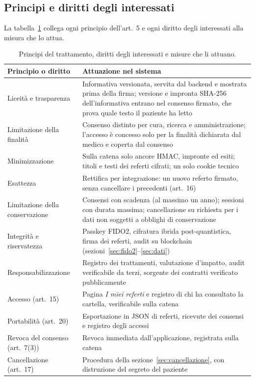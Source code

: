 \subsection{Principi e diritti degli interessati}
La tabella~\ref{tab:principi} collega ogni principio dell'art.~5 e ogni diritto degli interessati alla misura che lo attua.

\begin{table}[H]
\centering\footnotesize
\renewcommand{\arraystretch}{1.2}
\begin{tabular}{@{}p{} p{}@{}}
\toprule
Principio o diritto & Attuazione nel sistema\\
\midrule
Liceità e trasparenza & Informativa versionata, servita dal backend e mostrata prima della firma; versione e impronta SHA-256 dell'informativa entrano nel consenso firmato, che prova quale testo il paziente ha letto\\
Limitazione della finalità & Consenso distinto per cura, ricerca e amministrazione; l'accesso è concesso solo per la finalità dichiarata dal medico e coperta dal consenso\\
Minimizzazione & Sulla catena solo ancore HMAC, impronte ed esiti; titoli e testi dei referti cifrati; un solo cookie tecnico\\
Esattezza & Rettifica per integrazione: un nuovo referto firmato, senza cancellare i precedenti (art.~16)\\
Limitazione della conservazione & Consensi con scadenza (al massimo un anno); sessioni con durata massima; cancellazione su richiesta per i dati non soggetti a obblighi di conservazione\\
Integrità e riservatezza & Passkey FIDO2, cifratura ibrida post-quantistica, firma dei referti, audit su blockchain (sezioni~\ref{sec:fido2}--\ref{sec:dati})\\
Responsabilizzazione & Registro dei trattamenti, valutazione d'impatto, audit verificabile da terzi, sorgente dei contratti verificato pubblicamente\\
\midrule
Accesso (art.~15) & Pagina \emph{I miei referti} e registro di chi ha consultato la cartella, verificabile sulla catena\\
Portabilità (art.~20) & Esportazione in JSON di referti, ricevute dei consensi e registro degli accessi\\
Revoca del consenso (art.~7(3)) & Revoca immediata dall'applicazione, registrata sulla catena\\
Cancellazione (art.~17) & Procedura della sezione~\ref{sec:cancellazione}, con distruzione del segreto del paziente\\
\bottomrule
\end{tabular}
\caption{Principi del trattamento, diritti degli interessati e misure che li attuano.}\label{tab:principi}
\end{table}


